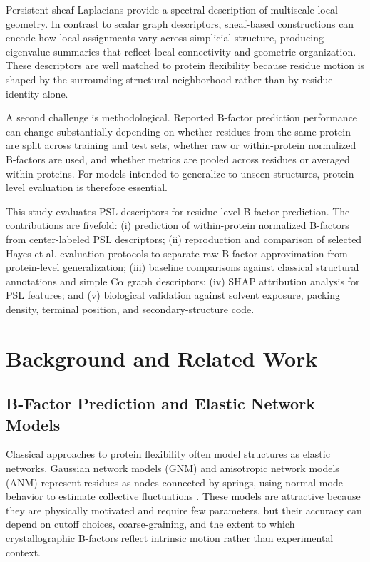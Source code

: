 \documentclass[11pt]{article}
\newcommand{\calpha}{C\ensuremath{\alpha}\xspace}
\begin{document}
Persistent sheaf Laplacians provide a spectral description of multiscale local geometry. In contrast to scalar graph descriptors, sheaf-based constructions can encode how local assignments vary across simplicial structure, producing eigenvalue summaries that reflect local connectivity and geometric organization. These descriptors are well matched to protein flexibility because residue motion is shaped by the surrounding structural neighborhood rather than by residue identity alone.

A second challenge is methodological. Reported B-factor prediction performance can change substantially depending on whether residues from the same protein are split across training and test sets, whether raw or within-protein normalized B-factors are used, and whether metrics are pooled across residues or averaged within proteins. For models intended to generalize to unseen structures, protein-level evaluation is therefore essential.

This study evaluates PSL descriptors for residue-level B-factor prediction. The contributions are fivefold: (i) prediction of within-protein normalized B-factors from center-labeled PSL descriptors; (ii) reproduction and comparison of selected Hayes et al. evaluation protocols to separate raw-B-factor approximation from protein-level generalization; (iii) baseline comparisons against classical structural annotations and simple \calpha graph descriptors; (iv) SHAP attribution analysis for PSL features; and (v) biological validation against solvent exposure, packing density, terminal position, and secondary-structure code.

\section{Background and Related Work}
\subsection{B-Factor Prediction and Elastic Network Models}
Classical approaches to protein flexibility often model structures as elastic networks. Gaussian network models (GNM) and anisotropic network models (ANM) represent residues as nodes connected by springs, using normal-mode behavior to estimate collective fluctuations \citep{haliloglu1997, atilgan2001, bahar2010}. These models are attractive because they are physically motivated and require few parameters, but their accuracy can depend on cutoff choices, coarse-graining, and the extent to which crystallographic B-factors reflect intrinsic motion rather than experimental context.
\end{document}
